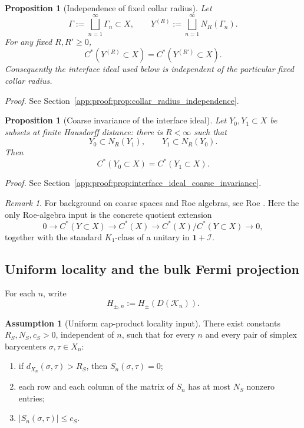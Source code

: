\documentclass[11pt]{article}
\numberwithin{equation}{section}
\newtheorem{proposition}[theorem]{Proposition}
\theoremstyle{definition}
\newtheorem{assumption}[theorem]{Assumption}
\theoremstyle{remark}
\newtheorem{remark}[theorem]{Remark}
\newcommand{\proofref}[1]{%
  \par\noindent\emph{Proof.} See Section~\ref{#1}.\par\medskip
}
\newcommand{\proofappendixref}[1]{\proofref{#1}}
\newcommand{\K}{\mathcal{K}}
\newcommand{\Id}{\mathbf{1}}
\begin{document}
\begin{proposition}[Independence of fixed collar radius]\label{prop:collar_radius_independence}
Let
\[
\Gamma:=\bigsqcup_{n=1}^\infty \Gamma_n\subset X,
\qquad
Y^{(R)}:=\bigsqcup_{n=1}^\infty N_R(\Gamma_n).
\]
For any fixed $R,R'\ge0$,
\[
C^*(Y^{(R)}\subset X)=C^*(Y^{(R')}\subset X).
\]
Consequently the interface ideal used below is independent of the particular fixed collar radius.
\end{proposition}
\proofappendixref{app:proof:prop:collar_radius_independence}




\begin{proposition}[Coarse invariance of the interface ideal]\label{prop:interface_ideal_coarse_invariance}
Let \(Y_0,Y_1\subset X\) be subsets at finite Hausdorff distance: there is \(R<\infty\) such that
\[
Y_0\subset N_R(Y_1),
\qquad
Y_1\subset N_R(Y_0).
\]
Then
\[
C^*(Y_0\subset X)=C^*(Y_1\subset X).
\]
\end{proposition}
\proofappendixref{app:proof:prop:interface_ideal_coarse_invariance}




\begin{remark}
For background on coarse spaces and Roe algebras, see Roe \cite{RoeLectures}. Here the only
Roe-algebra input is the concrete quotient extension
\[
0\to C^*(Y\subset X)\to C^*(X)\to C^*(X)/C^*(Y\subset X)\to 0,
\]
together with the standard $K_1$-class of a unitary in $\Id+\mathcal I$.
\end{remark}

\subsection{Uniform locality and the bulk Fermi projection}

For each $n$, write
\[
H_{\pm,n}:=H_\pm(D(\K_n)).
\]

\begin{assumption}[Uniform cap-product locality input]\label{ass:S_uniform}
There exist constants $R_S,N_S,c_S>0$, independent of $n$, such that for every $n$ and every pair
of simplex barycenters $\sigma,\tau\in X_n$:
\begin{enumerate}[label=(\roman*),leftmargin=2em]
\item if $d_{X_n}(\sigma,\tau)>R_S$, then $S_n(\sigma,\tau)=0$;
\item each row and each column of the matrix of $S_n$ has at most $N_S$ nonzero entries;
\item $|S_n(\sigma,\tau)|\le c_S$.
\end{enumerate}
\end{assumption}
\end{document}
